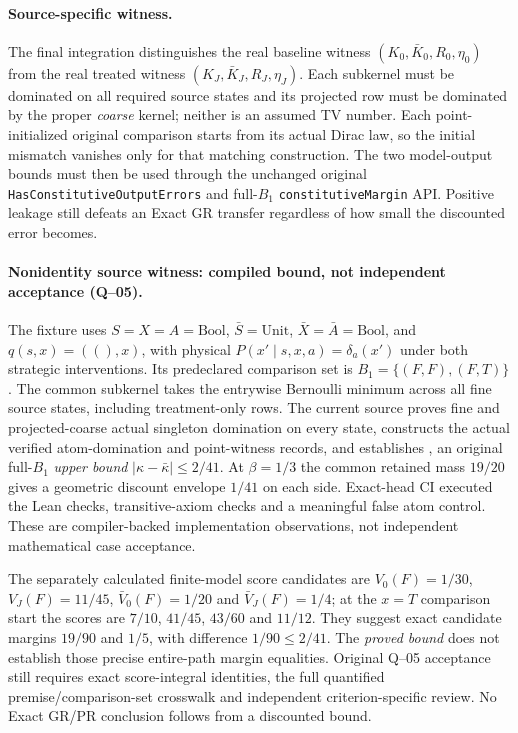 \paragraph{Source-specific witness.}
The final integration distinguishes the real baseline witness
$(K_0,\bar K_0,R_0,\eta_0)$ from the real treated witness
$(K_J,\bar K_J,R_J,\eta_J)$. Each subkernel must be dominated on all
required source states and its projected row must be dominated by the
proper \emph{coarse} kernel; neither is an assumed TV number. Each
point-initialized original comparison starts from its actual Dirac law,
so the initial mismatch vanishes only for that matching construction.
The two model-output bounds must then be used through the unchanged
original \texttt{HasConstitutiveOutputErrors} and full-$B_1$
\texttt{constitutiveMargin} API. Positive leakage still defeats an Exact
GR transfer regardless of how small the discounted error becomes.


\paragraph{Nonidentity source witness: compiled bound, not independent acceptance (Q--05).}
The fixture uses $S=X=A=\mathrm{Bool}$, $\bar S=\mathrm{Unit}$,
$\bar X=\bar A=\mathrm{Bool}$, and $q(s,x)=((),x)$, with physical
$P(x'\mid s,x,a)=\delta_a(x')$ under both strategic interventions.
Its predeclared comparison set is $B_1=\{(F,F),(F,T)\}$.
The common subkernel takes the entrywise Bernoulli minimum across
all fine source states, including treatment-only rows. The current
 source proves fine and projected-coarse
actual singleton domination on every state, constructs the actual
verified atom-domination and point-witness records, and establishes
, an original full-$B_1$
\emph{upper bound} $|\kappa-\bar\kappa|\le 2/41$.
At $\beta=1/3$ the common retained mass $19/20$ gives a geometric
discount envelope $1/41$ on each side. Exact-head CI executed the
Lean checks, transitive-axiom checks and a meaningful false atom
control. These are compiler-backed implementation observations, not
independent mathematical case acceptance.

The separately calculated finite-model score candidates are
$V_0(F)=1/30$, $V_J(F)=11/45$, $\bar V_0(F)=1/20$ and
$\bar V_J(F)=1/4$; at the $x=T$ comparison start the scores are
$7/10$, $41/45$, $43/60$ and $11/12$. They suggest exact candidate
margins $19/90$ and $1/5$, with difference $1/90\le 2/41$.
The \emph{proved bound} does not establish those precise
entire-path margin equalities. Original Q--05 acceptance still
requires exact score-integral identities, the full quantified
premise/comparison-set crosswalk and independent criterion-specific
review. No Exact GR/PR conclusion follows from a discounted bound.
